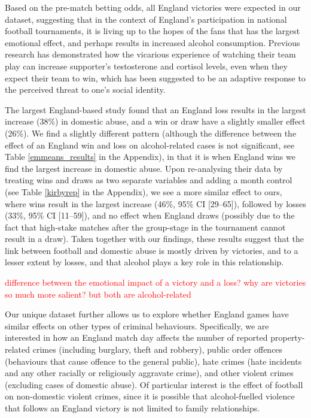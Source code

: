 \documentclass[12pt, letterpaper]{article}
\begin{document}
Based on the pre-match betting odds, all England victories were expected in our dataset, suggesting that in the context of England's participation in national football tournaments, it is living up to the hopes of the fans that has the largest emotional effect, and perhaps results in increased alcohol consumption\autocite{Davies2018}. Previous research has demonstrated how the vicarious experience of watching their team play can increase supporter's testosterone and cortisol levels, even when they expect their team to win, which has been suggested to be an adaptive response to the perceived threat to one's social identity\autocite{VanderMeij2012}.


The largest England-based study found that an England loss results in the largest increase (38\%) in domestic abuse, and a win or draw have a slightly smaller effect (26\%)\autocite{Kirby2014}. We find a slightly different pattern (although the difference between the effect of an England win and loss on alcohol-related cases is not significant, see Table \ref{emmeans_results} in the Appendix), in that it is when England wins we find the largest increase in domestic abuse. Upon re-analysing their data by treating wins and draws as two separate variables and adding a month control (see Table \ref{kirbyrep} in the Appendix), we see a more similar effect to ours, where wins result in the largest increase (46\%, 95\% CI [29--65]), followed by losses (33\%, 95\% CI [11--59]), and no effect when England draws (possibly due to the fact that high-stake matches after the group-stage in the tournament cannot result in a draw). Taken together with our findings, these results suggest that the link between football and domestic abuse is mostly driven by victories, and to a lesser extent by losses, and that alcohol plays a key role in this relationship.

\textcolor{red}{difference between the emotional impact of a victory and a loss? why are victories so much more salient? but both are alcohol-related}

Our unique dataset further allows us to explore whether England games have similar effects on other types of criminal behaviours. Specifically, we are interested in how an England match day affects the number of reported property-related crimes (including burglary, theft and robbery), public order offences (behaviours that cause offence to the general public), hate crimes (hate incidents and any other racially or religiously aggravate crime), and other violent crimes (excluding cases of domestic abuse). Of particular interest is the effect of football on non-domestic violent crimes, since it is possible that alcohol-fuelled violence that follows an England victory is not limited to family relationships.
\end{document}
